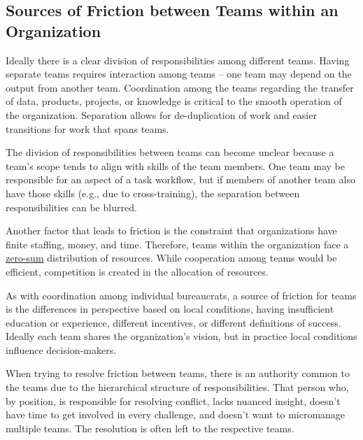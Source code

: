 \subsection*{Sources of Friction between Teams within an Organization}

Ideally there is a clear division of responsibilities among different teams. Having separate teams requires interaction among teams -- one team may depend on the output from another team. Coordination among the teams regarding the transfer of data, products, projects, or knowledge is critical to the smooth operation of the organization. Separation allows for de-duplication of work and easier transitions for work that spans teams. 

The division of  responsibilities between teams can become unclear because a team's scope tends to align with skills of the team members. One team may be responsible for an aspect of a task workflow, but if members of another team also have those skills (e.g., due to cross-training), the separation between responsibilities can be blurred. 
 

Another factor that leads to friction is the constraint that organizations have finite staffing, money, and time. Therefore, teams within the organization face a \href{https://en.wikipedia.org/wiki/Zero-sum_game}{zero-sum}
distribution of resources. While cooperation among teams would be efficient, competition is created in the allocation of resources.

As with coordination among individual bureaucrats, a source of friction for teams is the differences in perspective based on local conditions, having insufficient education or experience, different incentives, or different definitions of success. Ideally each team shares the organization's vision, but in practice local conditions influence decision-makers.

When trying to resolve friction between teams, there is an authority common to the teams due to the hierarchical structure of responsibilities. That person who, by position, is responsible for resolving conflict, lacks nuanced insight, doesn't have time to get involved in every challenge, and doesn't want to micromanage multiple teams. The resolution is often left to the respective teams. 


